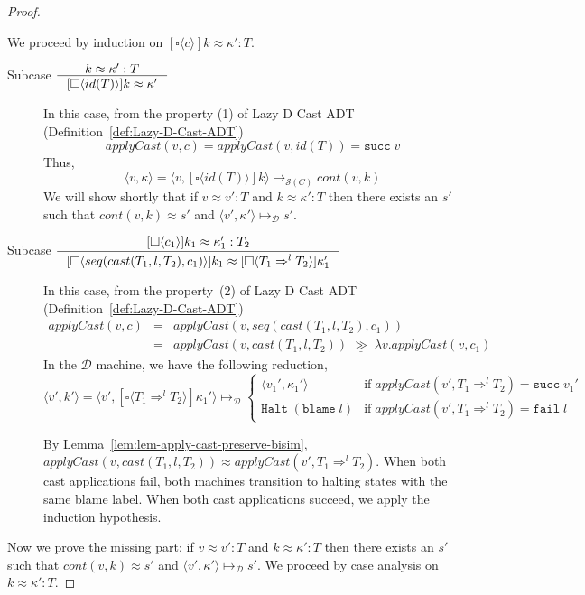 \documentclass[acmsmall,review]{acmart}\settopmatter{printfolios=true,printccs=false,printacmref=false}
\newcommand{\mbind}{\ensuremath{\;\underline{\gg}\;}}
\newcommand{\sOOreturn}[2]{\langle#1,#2\rangle}
\newcommand{\sOOhalt}[1]{\mathtt{Halt} \; #1}
\newcommand{\cOOcast}[3]{#1 \Rightarrow^{#2} #3}
\newcommand{\oOOblame}[1]{\mathtt{blame} \; #1}
\newcommand{\rOOsucc}[1]{\mathtt{succ}\;#1}
\newcommand{\rOOfail}[1]{\mathtt{fail}\;#1}
\newcommand{\kOOcast}[2]{
  [\square \langle #1 \rangle]#2}
\newcommand{\sidecond}[1]{\text{if}\;#1}
\newcommand{\ineffCEKD}{\ensuremath{\mathcal{D}}}
\newcommand{\effCEK}[1]{\ensuremath{\mathcal{S}(#1)}}
\newcommand{\continue}[2]{cont(#2,#1)}
\begin{document}
\begin{proof}
\begin{description}
	We proceed by induction on 
		$\kOOcast{c}{k} \approx \kappa' : T$. \\
		\begin{description}
		\item[Subcase $\inference{
			k \approx \kappa' : T
		}{
			\kOOcast{id(T)}{k} \approx \kappa'
		}$] 
		In this case, from the property (1) of Lazy D Cast ADT 
		(Definition~\ref{def:Lazy-D-Cast-ADT})
		\[applyCast(v,c) = applyCast(v,id(T)) = \rOOsucc{v}\]
		Thus,
		\[
		\sOOreturn{v}{\kappa} = \sOOreturn{v}{\kOOcast{id(T)}{k}}
		\longmapsto_{\effCEK{C}} \continue{k}{v}
		\]
		We will show shortly that if $v \approx v' : T$ and 
		$k \approx \kappa' : T$ then there exists an $s'$ such that
		$\continue{k}{v} \approx s'$ and
		$\sOOreturn{v'}{\kappa'} \longmapsto_{\ineffCEKD} s'$.
		\\
		\item[Subcase $\inference{
			\kOOcast{c_1}{k_1} \approx \kappa_1' : T_2
		}{
			\kOOcast{seq(cast(T_1,l,T_2),c_1)}{k_1} \approx 
			\kOOcast{\cOOcast{T_1}{l}{T_2}}{\kappa_1'}
		}$]
In this case, from the property~(2) of Lazy D Cast ADT 
(Definition~\ref{def:Lazy-D-Cast-ADT})
\[
\begin{array}{rcl}
applyCast(v,c) 
	&=& applyCast(v,seq(cast(T_1,l,T_2),c_1)) \\
	&=& applyCast(v,cast(T_1,l,T_2)) \mbind{} \lambda v. applyCast(v,c_1)
\end{array}
\]
In the \ineffCEKD{} machine, we have the following reduction,
\[
\sOOreturn{v'}{k'} 
=
\sOOreturn{v'}{\kOOcast{\cOOcast{T_1}{l}{T_2}}{\kappa_1'}} 
\longmapsto_{\ineffCEKD} 
\begin{cases}
	\sOOreturn{v_1'}{\kappa_1'} 
		& \sidecond{applyCast(v',\cOOcast{T_1}{l}{T_2}) = \rOOsucc{v_1'}}
	\\
	\sOOhalt{(\oOOblame{l})} 
		& \sidecond{applyCast(v',\cOOcast{T_1}{l}{T_2}) = \rOOfail{l}}
\end{cases}
\]

By Lemma~\ref{lem:lem-apply-cast-preserve-bisim}, 
$applyCast(v,cast(T_1,l,T_2)) \approx applyCast(v',\cOOcast{T_1}{l}{T_2})$.
When both cast applications fail, both machines transition to halting states 
with the same blame label.
When both cast applications succeed, we apply the induction hypothesis.
\end{description}
\end{description}
	
Now we prove the missing part: if $v \approx v' : T$ and 
$k \approx \kappa' : T$ then there exists an $s'$ such that
$\continue{k}{v} \approx s'$ and $\sOOreturn{v'}{\kappa'} 
\longmapsto_{\ineffCEKD} s'$. We proceed by case analysis on $k \approx \kappa' 
: T$.


\end{proof}
\end{document}
